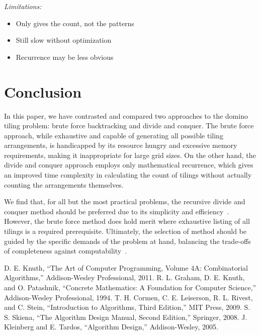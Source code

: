 \documentclass[conference]{IEEEtran}
\begin{document}
\textit{Limitations:}
\begin{itemize}
    \item Only gives the count, not the patterns
    \item Still slow without optimization
    \item Recurrence may be less obvious
\end{itemize}

\section{Conclusion}

In this paper, we have contrasted and compared two approaches to the domino tiling problem: brute force backtracking and divide and conquer. The brute force approach, while exhaustive and capable of generating all possible tiling arrangements, is handicapped by its resource hungry and excessive memory requirements, making it inappropriate for large grid sizes. On the other hand, the divide and conquer approach employs only mathematical recurrence, which gives an improved time complexity in calculating the count of tilings without actually counting the arrangements themselves.

We find that, for all but the most practical problems, the recursive divide and conquer method should be preferred due to its simplicity and efficiency~\cite{b1, b2}. However, the brute force method does hold merit where exhaustive listing of all tilings is a required prerequisite. Ultimately, the selection of method should be guided by the specific demands of the problem at hand, balancing the trade-offs of completeness against computability~\cite{b3, b5}.

\begin{thebibliography}{00}
 D. E. Knuth, ``The Art of Computer Programming, Volume 4A: Combinatorial Algorithms,'' Addison-Wesley Professional, 2011.
 R. L. Graham, D. E. Knuth, and O. Patashnik, ``Concrete Mathematics: A Foundation for Computer Science,'' Addison-Wesley Professional, 1994.
 T. H. Cormen, C. E. Leiserson, R. L. Rivest, and C. Stein, ``Introduction to Algorithms, Third Edition,'' MIT Press, 2009.
 S. S. Skiena, ``The Algorithm Design Manual, Second Edition,'' Springer, 2008.
 J. Kleinberg and E. Tardos, ``Algorithm Design,'' Addison-Wesley, 2005.
\end{thebibliography}
\end{document}
